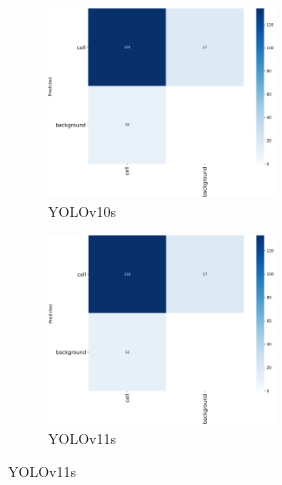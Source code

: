 \documentclass[12pt,a4paper,onecolumn,oneside]{report}
\begin{document}
\begin{figure}[H]
  \vspace{0.1cm}
  \begin{subfigure}[b]{0.45\textwidth}
    \centering
    \includegraphics[height=5cm]{figuras/resultados experimentacion/yolov10s/test2/confusion_matrix.png}
    \vspace{-0.3cm}
    \caption{\footnotesize YOLOv10s}
    \label{fig:confusion_yolov10s_test2}
  \end{subfigure}
  \hfill
  \begin{subfigure}[b]{0.45\textwidth}
    \centering
    \includegraphics[height=5cm]{figuras/resultados experimentacion/yolov11s/test2/confusion_matrix.png}
    \vspace{-0.3cm}
    \caption{\footnotesize YOLOv11s}
    \label{fig:confusion_yolov11s_test2}
  \end{subfigure}
  

\end{figure}
\end{document}
